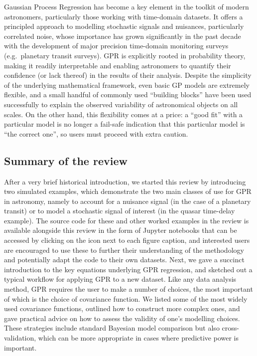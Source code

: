 \documentclass[letterpaper]{ar-1col}
\begin{document}
Gaussian Process Regression has become a key element in the toolkit of modern astronomers, particularly those working with time-domain datasets. It offers a principled approach to modelling stochastic signals and nuisances, particularly correlated noise, whose importance has grown significantly in the past decade with the development of major precision time-domain monitoring surveys (e.g.\ planetary transit surveys). GPR is explicitly 
rooted in probability theory, making it readily interpretable and enabling astronomers to quantify their confidence (or lack thereof) in the results of their analysis. Despite the simplicity of the underlying mathematical framework, even basic GP models are extremely flexible, and a small handful of commonly used ``building blocks'' have been used successfully to explain the observed variability of astronomical objects on all scales. On the other hand, this flexibility comes at a price: a ``good fit'' with a particular model is no longer a fail-safe indication that this particular model is ``the correct one'', so users must proceed with extra caution. 

\subsection{Summary of the review}

After a very brief historical introduction, we started this review by introducing two simulated examples, which demonstrate the two main classes of use for GPR in astronomy, namely to account for a nuisance signal (in the case of a planetary transit) or to model a stochastic signal of interest (in the quasar time-delay example). The source code for these and other worked examples in the review is available alongside this review in the form of {\sc Jupyter} notebooks that can be accessed by clicking on the icon next to each figure caption, and interested users are encouraged to use these to further their understanding of the methodology and potentially adapt the code to their own datasets. Next, we gave a succinct introduction to the key equations underlying GPR regression, and sketched out a typical workflow for applying GPR to a new dataset. Like any data analysis method, GPR requires the user to make a number of choices, the most important of which is the choice of covariance function. We listed some of the most widely used covariance functions, outlined how to construct more complex ones, and gave practical advice on how to assess the validity of one's modelling choices. These strategies include standard Bayesian model comparison but also cross-validation, which can be more appropriate in cases where predictive power is important. 
\end{document}
